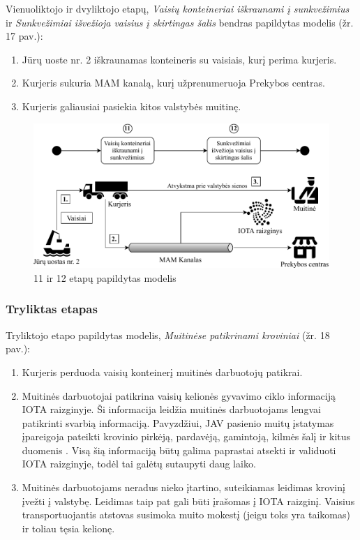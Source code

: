 Vienuoliktojo ir dvyliktojo etapų, \textit{Vaisių konteineriai iškraunami į sunkvežimius} ir \textit{Sunkvežimiai išvežioja vaisius į skirtingas šalis} bendras papildytas modelis (žr. 17 pav.):
\begin{enumerate}
    \item Jūrų uoste nr. 2 iškraunamas konteineris su vaisiais, kurį perima kurjeris.
    \item Kurjeris sukuria MAM kanalą, kurį užprenumeruoja Prekybos centras.
    \item Kurjeris galiausiai pasiekia kitos valstybės muitinę.
\end{enumerate}

\begin{figure}[H]
    \centering
    \includegraphics[scale=0.70]{images/iota-usecase-11-12}
    \caption{11 ir 12 etapų papildytas modelis}
\end{figure}




\subsubsection{Tryliktas etapas}

Tryliktojo etapo papildytas modelis, \textit{Muitinėse patikrinami kroviniai} (žr. 18 pav.):
\begin{enumerate}
    \item Kurjeris perduoda vaisių konteinerį muitinės darbuotojų patikrai.
    \item Muitinės darbuotojai patikrina vaisių kelionės gyvavimo ciklo informaciją IOTA raizginyje. Ši informacija leidžia muitinės darbuotojams lengvai patikrinti svarbią informaciją. Pavyzdžiui, JAV pasienio muitų įstatymas įpareigoja pateikti krovinio pirkėją, pardavėją, gamintoją, kilmės šalį ir kitus duomenis \cite{customs2018importer}. Visą šią informaciją būtų galima paprastai atsekti ir validuoti IOTA raizginyje, todėl tai galėtų sutaupyti daug laiko. 
    \item Muitinės darbuotojams neradus nieko įtartino, suteikiamas leidimas krovinį įvežti į valstybę. Leidimas taip pat gali būti įrašomas į IOTA raizginį. Vaisius transportuojantis atstovas susimoka muito mokestį (jeigu toks yra taikomas) ir toliau tęsia kelionę.
\end{enumerate}

